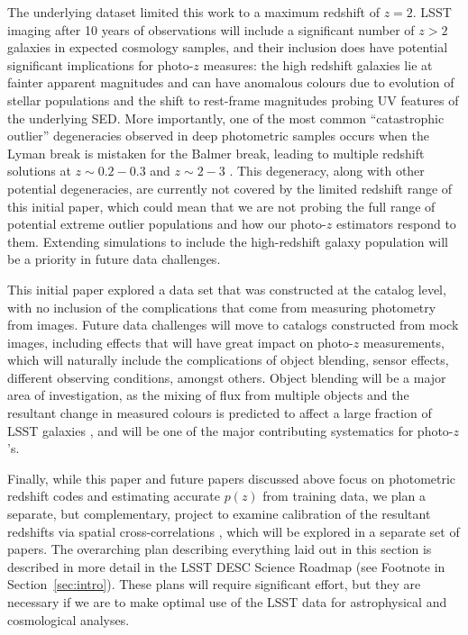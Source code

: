 The underlying dataset limited this work to a maximum redshift of $z=2$.  LSST imaging after 10 years of observations will include a significant number of $z>2$ galaxies in expected cosmology samples, and their inclusion does have potential significant implications for photo-$z$ measures: the high redshift galaxies lie at fainter apparent magnitudes and can have anomalous colours due to evolution of stellar populations and the shift to rest-frame magnitudes probing UV features of the underlying SED.  More importantly, one of the most common ``catastrophic outlier'' degeneracies observed in deep photometric samples occurs when the Lyman break is mistaken for the Balmer break, leading to multiple redshift solutions at $z\sim0.2-0.3$ and $z\sim2-3$ \citep{Massarotti:2001}.  This degeneracy, along with other potential degeneracies, are currently not covered by the limited redshift range of this initial paper, which could mean that we are not probing the full range of potential extreme outlier populations and how our photo-$z$ estimators respond to them. Extending simulations to include the high-redshift galaxy population will be a priority in future data challenges.

This initial paper explored a data set that was constructed at the catalog level, with no inclusion of the complications that come from measuring photometry from images.  Future data challenges will move to catalogs constructed from mock images, including effects that will have great impact on photo-$z$ measurements, which will naturally include the complications of object blending, sensor effects, different observing conditions, amongst others.  Object blending will be a major area of investigation, as the mixing of flux from multiple objects and the resultant change in measured colours is predicted to affect a large fraction of LSST galaxies \citep{Dawson:2016}, and will be one of the major contributing systematics for photo-$z$'s. 

Finally, while this paper and future papers discussed above focus on photometric redshift codes and estimating accurate $p(z)$ from training data, we plan a separate, but complementary, project to examine calibration of the resultant redshifts via spatial cross-correlations \citep{Newman:2008}, which will be explored in a separate set of papers.  The overarching plan describing everything laid out in this section is described in more detail in the LSST DESC Science Roadmap (see Footnote in Section~\ref{sec:intro}).  These plans will require significant effort, but they are necessary if we are to make optimal use of the LSST data for astrophysical and cosmological analyses.   
